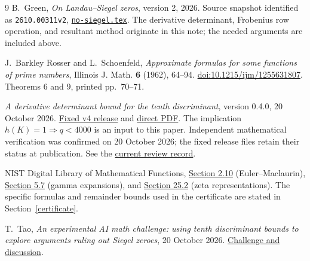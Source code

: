 \documentclass[11pt]{article}
\begin{document}
\begin{thebibliography}{9}
B.~Green, \emph{On Landau--Siegel zeros}, version 2, 2026.
Source snapshot identified as \texttt{2610.00311v2},
\href{https://hexagonmath.org/api/v1/works/2610.00311v2/source?path=no-siegel.tex}
{\texttt{no-siegel.tex}}.
The derivative determinant, Frobenius row operation, and resultant method
originate in this note; the needed arguments are included above.

J.~Barkley Rosser and L.~Schoenfeld,
\emph{Approximate formulas for some functions of prime numbers},
Illinois J. Math. \textbf{6} (1962), 64--94.
\href{https://doi.org/10.1215/ijm/1255631807}{doi:10.1215/ijm/1255631807}.
Theorems 6 and 9, printed pp.~70--71.

\emph{A derivative determinant bound for the tenth discriminant},
version 0.4.0, 20 October 2026.
\href{https://github.com/twinheterodox/tenth-discriminant/releases/tag/v0.4.0}
{Fixed v4 release} and
\href{https://github.com/twinheterodox/tenth-discriminant/releases/download/v0.4.0/tenth-discriminant-v0.4.0.pdf}
{direct PDF}.
The implication \(h(K)=1\Rightarrow q<4000\) is an input to this paper.
Independent mathematical verification was confirmed on 20 October 2026;
the fixed release files retain their status at publication. See the
\href{https://github.com/twinheterodox/tenth-discriminant/blob/main/REVIEW.md}
{current review record}.

NIST Digital Library of Mathematical Functions,
\href{https://dlmf.nist.gov/2.10}{Section 2.10} (Euler--Maclaurin),
\href{https://dlmf.nist.gov/5.7}{Section 5.7} (gamma expansions), and
\href{https://dlmf.nist.gov/25.2}{Section 25.2} (zeta representations).
The specific formulas and remainder bounds used in the certificate are
stated in Section~\ref{certificate}.

T.~Tao, \emph{An experimental AI math challenge: using tenth discriminant
bounds to explore arguments ruling out Siegel zeroes}, 20 October 2026.
\href{https://terrytao.wordpress.com/2026/10/20/an-experimental-ai-math-challenge-using-tenth-discriminant-bounds-to-explore-arguments-ruling-out-siegel-zeroes/}
{Challenge and discussion}.
\end{thebibliography}
\end{document}
